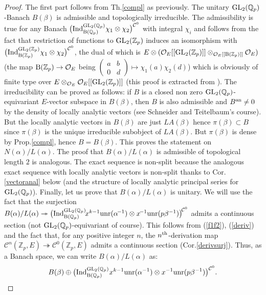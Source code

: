\documentclass[11pt]{amsart}
\def\Z{{\mathbb Z}_p}
\def\Q{{\mathbb Q}_p}
\def\G{{\rm GL}_2(\Q)}
\def\K{{\rm GL}_2(\Z)}
\def\B{{\rm B}(\Q)}
\def\BK{{\rm B}(\Z)}
\def\O{{\mathcal O}_E}
\begin{document}
\begin{proof} 
The first part follows from Th.\ref{compl} as previously. The unitary
$\G$-Banach $B(\beta)$ is admissible and topologically
irreducible. The admissibility is true for any Banach $\big({\rm
  Ind}_{\B}^{\G}\chi_1\otimes \chi_2\big)^{{\mathcal C}^0}$ with
integral $\chi_i$ and follows from the fact that restriction of
functions to $\K$ induces an isomorphism with $\big({\rm
  Ind}_{\BK}^{\K}\chi_1\otimes \chi_2\big)^{{\mathcal C}^0}$\!\!\!,
the dual of which is $E\otimes (\O[[\K]]\otimes_{\O[[\BK]]}\O)$ (the
map $\BK\rightarrow \O$ being
$\begin{pmatrix}a&b\\0&d\end{pmatrix}\mapsto \chi_1(a)\chi_2(d)$)
  which is obviously of finite type over $E\otimes_{\O}\O[[\K]]$ (this
  proof is extracted from \cite{ST3}). The irreducibility can be
  proved as follows: if $B$ is a closed non zero $\G$-equivariant
  $E$-vector subspace in $B(\beta)$, then $B$ is also admissible and
  $B^{\rm an}\ne 0$ by the density of locally analytic vectors (see
  Schneider and Teitelbaum's course). But the locally analytic vectors
  in $B(\beta)$ are just $LA(\beta)$ hence $\pi(\beta)\subset B$ since
  $\pi(\beta)$ is the unique irreducible subobject of $LA(\beta)$. But
  $\pi(\beta)$ is dense by Prop.\ref{compl}, hence $B=B(\beta)$. This
  proves the statement on $N(\alpha)/L(\alpha)$. The proof that
  $B(\alpha)/L(\alpha)$ is admissible of topological length $2$ is
  analogous. The exact sequence is non-split because the analogous
  exact sequence with locally analytic vectors is non-split thanks to
  Cor.\ref{vectoranal} below (and the structure of locally analytic
  principal series for $\G$). Finally, let us prove that
  $B(\alpha)/L(\alpha)$ is unitary. We will use the fact that the
  surjection $B(\alpha)/L(\alpha)\twoheadrightarrow \big({\rm
    Ind}_{\B}^{\G}\!x^{k-1}{\rm unr}(\alpha^{\!-1})\otimes
  x^{\!-1}{\rm unr}(p\beta^{-1})\big)^{\!{\mathcal C}^0}$ admits a
  continuous section (not $\G$-equivariant of course). This follows
  from (\ref{f1f2}), (\ref{deriv}) and the fact that, for any positive
  integer $n$, the $n^{\rm th}$-derivation map ${\mathcal
    C}^n(\Z,E)\twoheadrightarrow {\mathcal C}^0(\Z,E)$ admits a
  continuous section (Cor.\ref{derivsurj}). Thus, as a Banach space,
  we can write $B(\alpha)/L(\alpha)$ as:  
\begin{eqnarray}\label{ondecoupe} 
B(\beta)\oplus \big({\rm Ind}_{\B}^{\G}x^{k-1}
{\rm unr}(\alpha^{-1})\otimes x^{-1}{\rm unr}(p\beta^{-1})\big)^{{\mathcal C}^0}. 

\end{eqnarray}
\end{proof}
\end{document}
